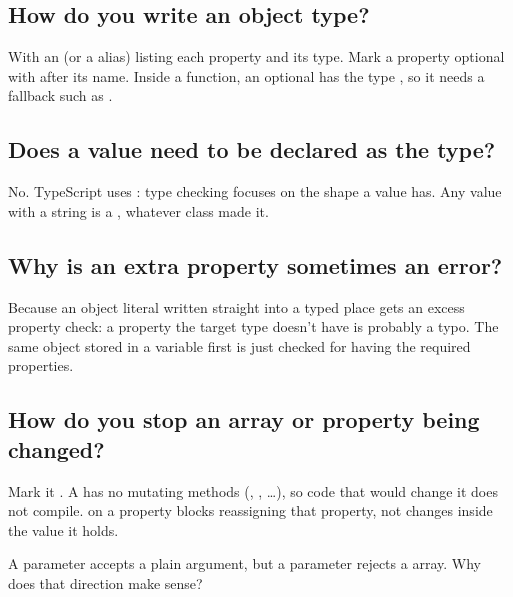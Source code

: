 \label{ch:c17}

\subsection{How do you write an object type?}%
With an  (or a  alias) listing each property and its type. Mark a property optional with  after its name. Inside a function, an optional  has the type , so it needs a fallback such as .

\subsection{Does a value need to be declared as the type?}%
No. TypeScript uses : type checking focuses on the shape a value has. Any value with a string  is a , whatever class made it.

\subsection{Why is an extra property sometimes an error?}%
Because an object literal written straight into a typed place gets an excess property check: a property the target type doesn't have is probably a typo. The same object stored in a variable first is just checked for having the required properties.

\subsection{How do you stop an array or property being changed?}%
Mark it . A  has no mutating methods (, , \ldots), so code that would change it does not compile.  on a property blocks reassigning that property, not changes inside the value it holds.

\begin{ponder}A  parameter accepts a plain  argument, but a  parameter rejects a  array. Why does that direction make sense?\end{ponder}
